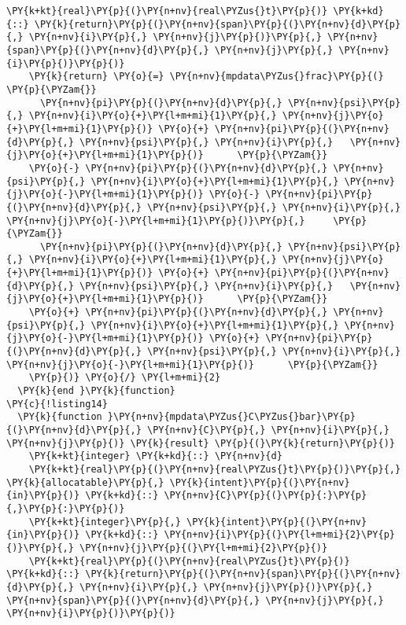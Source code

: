 \begin{Verbatim}[commandchars=\\\{\}]
    \PY{k+kt}{real}\PY{p}{(}\PY{n+nv}{real\PYZus{}t}\PY{p}{)} \PY{k+kd}{::} \PY{k}{return}\PY{p}{(}\PY{n+nv}{span}\PY{p}{(}\PY{n+nv}{d}\PY{p}{,} \PY{n+nv}{i}\PY{p}{,} \PY{n+nv}{j}\PY{p}{)}\PY{p}{,} \PY{n+nv}{span}\PY{p}{(}\PY{n+nv}{d}\PY{p}{,} \PY{n+nv}{j}\PY{p}{,} \PY{n+nv}{i}\PY{p}{)}\PY{p}{)}
    \PY{k}{return} \PY{o}{=} \PY{n+nv}{mpdata\PYZus{}frac}\PY{p}{(}                              \PY{p}{\PYZam{}}
      \PY{n+nv}{pi}\PY{p}{(}\PY{n+nv}{d}\PY{p}{,} \PY{n+nv}{psi}\PY{p}{,} \PY{n+nv}{i}\PY{o}{+}\PY{l+m+mi}{1}\PY{p}{,} \PY{n+nv}{j}\PY{o}{+}\PY{l+m+mi}{1}\PY{p}{)} \PY{o}{+} \PY{n+nv}{pi}\PY{p}{(}\PY{n+nv}{d}\PY{p}{,} \PY{n+nv}{psi}\PY{p}{,} \PY{n+nv}{i}\PY{p}{,}   \PY{n+nv}{j}\PY{o}{+}\PY{l+m+mi}{1}\PY{p}{)}      \PY{p}{\PYZam{}}
    \PY{o}{-} \PY{n+nv}{pi}\PY{p}{(}\PY{n+nv}{d}\PY{p}{,} \PY{n+nv}{psi}\PY{p}{,} \PY{n+nv}{i}\PY{o}{+}\PY{l+m+mi}{1}\PY{p}{,} \PY{n+nv}{j}\PY{o}{-}\PY{l+m+mi}{1}\PY{p}{)} \PY{o}{-} \PY{n+nv}{pi}\PY{p}{(}\PY{n+nv}{d}\PY{p}{,} \PY{n+nv}{psi}\PY{p}{,} \PY{n+nv}{i}\PY{p}{,}   \PY{n+nv}{j}\PY{o}{-}\PY{l+m+mi}{1}\PY{p}{)}\PY{p}{,}     \PY{p}{\PYZam{}}
      \PY{n+nv}{pi}\PY{p}{(}\PY{n+nv}{d}\PY{p}{,} \PY{n+nv}{psi}\PY{p}{,} \PY{n+nv}{i}\PY{o}{+}\PY{l+m+mi}{1}\PY{p}{,} \PY{n+nv}{j}\PY{o}{+}\PY{l+m+mi}{1}\PY{p}{)} \PY{o}{+} \PY{n+nv}{pi}\PY{p}{(}\PY{n+nv}{d}\PY{p}{,} \PY{n+nv}{psi}\PY{p}{,} \PY{n+nv}{i}\PY{p}{,}   \PY{n+nv}{j}\PY{o}{+}\PY{l+m+mi}{1}\PY{p}{)}      \PY{p}{\PYZam{}}
    \PY{o}{+} \PY{n+nv}{pi}\PY{p}{(}\PY{n+nv}{d}\PY{p}{,} \PY{n+nv}{psi}\PY{p}{,} \PY{n+nv}{i}\PY{o}{+}\PY{l+m+mi}{1}\PY{p}{,} \PY{n+nv}{j}\PY{o}{-}\PY{l+m+mi}{1}\PY{p}{)} \PY{o}{+} \PY{n+nv}{pi}\PY{p}{(}\PY{n+nv}{d}\PY{p}{,} \PY{n+nv}{psi}\PY{p}{,} \PY{n+nv}{i}\PY{p}{,}   \PY{n+nv}{j}\PY{o}{-}\PY{l+m+mi}{1}\PY{p}{)}      \PY{p}{\PYZam{}}
    \PY{p}{)} \PY{o}{/} \PY{l+m+mi}{2}
  \PY{k}{end }\PY{k}{function}
\PY{c}{!listing14}
  \PY{k}{function }\PY{n+nv}{mpdata\PYZus{}C\PYZus{}bar}\PY{p}{(}\PY{n+nv}{d}\PY{p}{,} \PY{n+nv}{C}\PY{p}{,} \PY{n+nv}{i}\PY{p}{,} \PY{n+nv}{j}\PY{p}{)} \PY{k}{result} \PY{p}{(}\PY{k}{return}\PY{p}{)}
    \PY{k+kt}{integer} \PY{k+kd}{::} \PY{n+nv}{d}
    \PY{k+kt}{real}\PY{p}{(}\PY{n+nv}{real\PYZus{}t}\PY{p}{)}\PY{p}{,} \PY{k}{allocatable}\PY{p}{,} \PY{k}{intent}\PY{p}{(}\PY{n+nv}{in}\PY{p}{)} \PY{k+kd}{::} \PY{n+nv}{C}\PY{p}{(}\PY{p}{:}\PY{p}{,}\PY{p}{:}\PY{p}{)} 
    \PY{k+kt}{integer}\PY{p}{,} \PY{k}{intent}\PY{p}{(}\PY{n+nv}{in}\PY{p}{)} \PY{k+kd}{::} \PY{n+nv}{i}\PY{p}{(}\PY{l+m+mi}{2}\PY{p}{)}\PY{p}{,} \PY{n+nv}{j}\PY{p}{(}\PY{l+m+mi}{2}\PY{p}{)}
    \PY{k+kt}{real}\PY{p}{(}\PY{n+nv}{real\PYZus{}t}\PY{p}{)} \PY{k+kd}{::} \PY{k}{return}\PY{p}{(}\PY{n+nv}{span}\PY{p}{(}\PY{n+nv}{d}\PY{p}{,} \PY{n+nv}{i}\PY{p}{,} \PY{n+nv}{j}\PY{p}{)}\PY{p}{,} \PY{n+nv}{span}\PY{p}{(}\PY{n+nv}{d}\PY{p}{,} \PY{n+nv}{j}\PY{p}{,} \PY{n+nv}{i}\PY{p}{)}\PY{p}{)}


\end{Verbatim}
